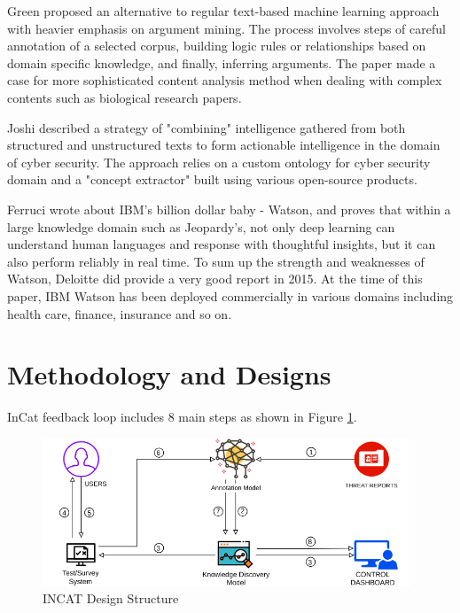 \documentclass{article} %
\begin{document}
Green \cite{Green2018TowardsSchemes} proposed an alternative to regular text-based machine learning approach with heavier emphasis on argument mining. The process involves steps of careful annotation of a selected corpus, building logic rules or relationships based on domain specific knowledge, and finally, inferring arguments. The paper made a case for more sophisticated content analysis method when dealing with complex contents such as biological research papers.

Joshi \cite{Joshi2013ExtractingText} described a strategy of "combining" intelligence gathered from both structured and unstructured texts to form actionable intelligence in the domain of cyber security. The approach relies on a custom ontology for cyber security domain and a "concept extractor" built using various open-source products.

Ferruci \cite{Ferrucci2010BuildingProject} wrote about IBM's billion dollar baby - Watson, and proves that within a large knowledge domain such as Jeopardy's, not only deep learning can understand human languages and response with thoughtful insights, but it can also perform reliably in real time. To sum up the strength and weaknesses of Watson, Deloitte did provide a very good report \cite{DeloitteDevelopment2015DisruptionWatson} in 2015. At the time of this paper, IBM Watson has been deployed commercially in various domains including health care, finance, insurance and so on.

\section{Methodology and Designs}
InCat feedback loop includes 8 main steps as shown in Figure \ref{Figure:IncatDesign}. 

\begin{figure}[h]
  \centering
  \includegraphics[width=11cm]{images/INCAT-Designs.png}
  \caption{INCAT Design Structure}
  \label{Figure:IncatDesign}
\end{figure}
\end{document}
